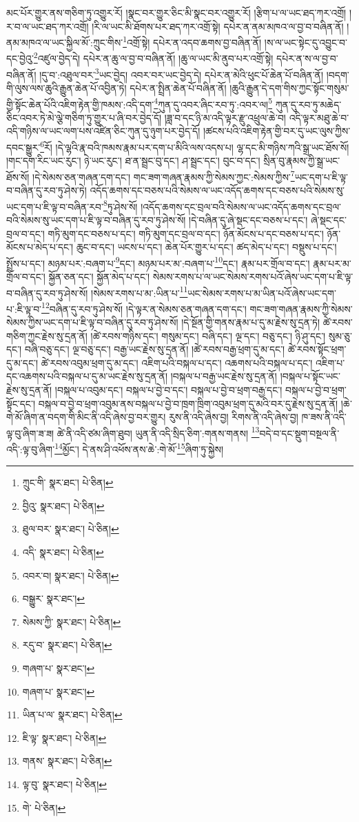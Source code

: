 མང་པོར་གྱུར་ནས་གཅིག་ཏུ་འགྱུར་རོ། །སྣང་བར་གྱུར་ཅིང་མི་སྣང་བར་འགྱུར་རོ། །རྩིག་པ་ལ་ཡང་ཐད་ཀར་འགྲོ། །ར་བ་ལ་ཡང་ཐད་ཀར་འགྲོ། །རི་ལ་ཡང་མི་ཐོགས་པར་ཐད་ཀར་འགྲོ་སྟེ། དཔེར་ན་ནམ་མཁའ་ལ་བྱ་བ་བཞིན་ནོ། །ནམ་མཁའ་ལ་ཡང་སྐྱིལ་མོ་:ཀྲུང་གིས་\footnote{ཀྲུང་གི་  སྣར་ཐང་།  པེ་ཅིན། }འགྲོ་སྟེ། དཔེར་ན་འདབ་ཆགས་བྱ་བཞིན་ནོ། །ས་ལ་ཡང་སྟེང་དུ་འབྱུང་བ་དང་བྱེའུ་\footnote{བྱིའུ་  སྣར་ཐང་།  པེ་ཅིན། }འཛུལ་བྱེད་དེ། དཔེར་ན་ཆུ་ལ་བྱ་བ་བཞིན་ནོ། །ཆུ་ལ་ཡང་མི་ནུབ་པར་འགྲོ་སྟེ། དཔེར་ན་ས་ལ་བྱ་བ་བཞིན་ནོ། །དུ་བ་:འཐུལ་བར་\footnote{ཐུལ་བར་  སྣར་ཐང་།  པེ་ཅིན། }ཡང་བྱེད། འབར་བར་ཡང་བྱེད་དེ། དཔེར་ན་མེའི་ཕུང་པོ་ཆེན་པོ་བཞིན་ནོ། །བདག་གི་ལུས་ལས་ཆུའི་རྒྱུན་ཆེན་པོ་འབྱིན་ཏེ། དཔེར་ན་སྤྲིན་ཆེན་པོ་བཞིན་ནོ། །ཆུའི་རྒྱུན་དེ་དག་གིས་ཀྱང་སྟོང་གསུམ་གྱི་སྟོང་ཆེན་པོའི་འཇིག་རྟེན་གྱི་ཁམས་:འདི་དག་\footnote{འདི་  སྣར་ཐང་།  པེ་ཅིན། }ཀུན་དུ་འབར་ཞིང་རབ་ཏུ་:འབར་ལ།\footnote{འབར་བ།  སྣར་ཐང་།  པེ་ཅིན། } ཀུན་དུ་རབ་ཏུ་མཆེད་ཅིང་འབར་ཏེ་མེ་ལྕེ་གཅིག་ཏུ་གྱུར་པ་ཞི་བར་བྱེད་དོ། །ཟླ་བ་དང་ཉི་མ་འདི་ལྟར་རྫུ་འཕྲུལ་ཆེ་བ། འདི་ལྟར་མཐུ་ཆེ་བ་འདི་གཉིས་ལ་ཡང་ལག་པས་འཛིན་ཅིང་ཀུན་དུ་ཉུག་པར་བྱེད་དོ། །ཚངས་པའི་འཇིག་རྟེན་གྱི་བར་དུ་ཡང་ལུས་ཀྱིས་དབང་སྒྱུར་\footnote{བསྒྱུར་  སྣར་ཐང་། }རོ། །དེ་ལྷའི་རྣ་བའི་ཁམས་རྣམ་པར་དག་པ་མིའི་ལས་འདས་པ། ལྷ་དང་མི་གཉིས་ཀའི་སྒྲ་ཡང་ཐོས་སོ། །གང་དག་རིང་ཡང་རུང་། ཉེ་ཡང་རུང་། ཐ་ན་སྦྲང་བུ་དང་། ཤ་སྦྲང་དང་། བུང་བ་དང་། སྲིན་བུ་རྣམས་ཀྱི་སྒྲ་ཡང་ཐོས་སོ། །དེ་སེམས་ཅན་གཞན་དག་དང་། གང་ཟག་གཞན་རྣམས་ཀྱི་སེམས་ཀྱང་:སེམས་ཀྱིས་\footnote{སེམས་ཀྱི་  སྣར་ཐང་།  པེ་ཅིན། }ཡང་དག་པ་ཇི་ལྟ་བ་བཞིན་དུ་རབ་ཏུ་ཤེས་ཏེ། འདོད་ཆགས་དང་བཅས་པའི་སེམས་ལ་ཡང་འདོད་ཆགས་དང་བཅས་པའི་སེམས་སུ་ཡང་དག་པ་ཇི་ལྟ་བ་བཞིན་རབ་\footnote{རདུ་བ་  སྣར་ཐང་།  པེ་ཅིན། }ཏུ་ཤེས་སོ། །འདོད་ཆགས་དང་བྲལ་བའི་སེམས་ལ་ཡང་འདོད་ཆགས་དང་བྲལ་བའི་སེམས་སུ་ཡང་དག་པ་ཇི་ལྟ་བ་བཞིན་དུ་རབ་ཏུ་ཤེས་སོ། །དེ་བཞིན་དུ་ཞེ་སྡང་དང་བཅས་པ་དང་། ཞེ་སྡང་དང་བྲལ་བ་དང་། གཏི་མུག་དང་བཅས་པ་དང་། གཏི་མུག་དང་བྲལ་བ་དང་། ཉོན་མོངས་པ་དང་བཅས་པ་དང་། ཉོན་མོངས་པ་མེད་པ་དང་། ཆུང་བ་དང་། ཡངས་པ་དང་། ཆེན་པོར་གྱུར་པ་དང་། ཚད་མེད་པ་དང་། བསྡུས་པ་དང་། སྤྲོས་པ་དང་། མཉམ་པར་:བཞག་པ་\footnote{གཞག་པ་  སྣར་ཐང་། }དང་། མཉམ་པར་མ་:བཞག་པ་\footnote{གཞག་པ་  སྣར་ཐང་། }དང་། རྣམ་པར་གྲོལ་བ་དང་། རྣམ་པར་མ་གྲོལ་བ་དང་། སྐྱོན་ཅན་དང་། སྐྱོན་མེད་པ་དང་། སེམས་རགས་པ་ལ་ཡང་སེམས་རགས་པའོ་ཞེས་ཡང་དག་པ་ཇི་ལྟ་བ་བཞིན་དུ་རབ་ཏུ་ཤེས་སོ། །སེམས་རགས་པ་མ་:ཡིན་པ་\footnote{ཡིན་པ་ལ་  སྣར་ཐང་།  པེ་ཅིན། }ཡང་སེམས་རགས་པ་མ་ཡིན་པའོ་ཞེས་ཡང་དག་པ་:ཇི་ལྟ་བ་\footnote{ཇི་ལྟ་  སྣར་ཐང་།  པེ་ཅིན། }བཞིན་དུ་རབ་ཏུ་ཤེས་སོ། །དེ་ལྟར་ན་སེམས་ཅན་གཞན་དག་དང་། གང་ཟག་གཞན་རྣམས་ཀྱི་སེམས་སེམས་ཀྱིས་ཡང་དག་པ་ཇི་ལྟ་བ་བཞིན་དུ་རབ་ཏུ་ཤེས་སོ། །དེ་སྔོན་གྱི་གནས་རྣམ་པ་དུ་མ་རྗེས་སུ་དྲན་ཏེ། ཚེ་རབས་གཅིག་ཀྱང་རྗེས་སུ་དྲན་ནོ། །ཚེ་རབས་གཉིས་དང་། གསུམ་དང་། བཞི་དང་། ལྔ་དང་། བཅུ་དང་། ཉི་ཤུ་དང་། སུམ་ཅུ་དང་། བཞི་བཅུ་དང་། ལྔ་བཅུ་དང་། བརྒྱ་ཡང་རྗེས་སུ་དྲན་ནོ། །ཚེ་རབས་བརྒྱ་ཕྲག་དུ་མ་དང་། ཚེ་རབས་སྟོང་ཕྲག་དུ་མ་དང་། ཚེ་རབས་འབུམ་ཕྲག་དུ་མ་དང་། འཇིག་པའི་བསྐལ་པ་དང་། འཆགས་པའི་བསྐལ་པ་དང་། འཇིག་པ་དང་འཆགས་པའི་བསྐལ་པ་དུ་མ་ཡང་རྗེས་སུ་དྲན་ནོ། །བསྐལ་པ་བརྒྱ་ཡང་རྗེས་སུ་དྲན་ནོ། །བསྐལ་པ་སྟོང་ཡང་རྗེས་སུ་དྲན་ནོ། །བསྐལ་པ་འབུམ་དང་། བསྐལ་པ་བྱེ་བ་དང་། བསྐལ་པ་བྱེ་བ་ཕྲག་བརྒྱ་དང་། བསྐལ་པ་བྱེ་བ་ཕྲག་སྟོང་དང་། བསྐལ་བ་བྱེ་བ་ཕྲག་འབུམ་ནས་བསྐལ་པ་བྱེ་བ་ཁྲག་ཁྲིག་འབུམ་ཕྲག་དུ་མའི་བར་དུ་རྗེས་སུ་དྲན་ནོ། །ཆེ་གེ་མོ་ཞིག་ན་བདག་གི་མིང་ནི་འདི་ཞེས་བྱ་བར་གྱུར། རུས་ནི་འདི་ཞེས་བྱ། རིགས་ནི་འདི་ཞེས་བྱ། ཁ་ཟས་ནི་འདི་ལྟ་བུ་ཞིག་ཟ་ཟ། ཚེ་ནི་འདི་ཙམ་ཞིག་ཐུབ། ཡུན་ནི་འདི་སྲིད་ཅིག་:གནས་གནས། \footnote{གནས་  སྣར་ཐང་།  པེ་ཅིན། }བདེ་བ་དང་སྡུག་བསྔལ་ནི་འདི་:ལྟ་བུ་ཞིག་\footnote{ལྟ་བུ་  སྣར་ཐང་།  པེ་ཅིན། }མྱོང་། དེ་ནས་ཤི་འཕོས་ནས་ཆེ་:གེ་མོ་\footnote{གེ་  པེ་ཅིན། }ཞིག་ཏུ་སྐྱེས། 